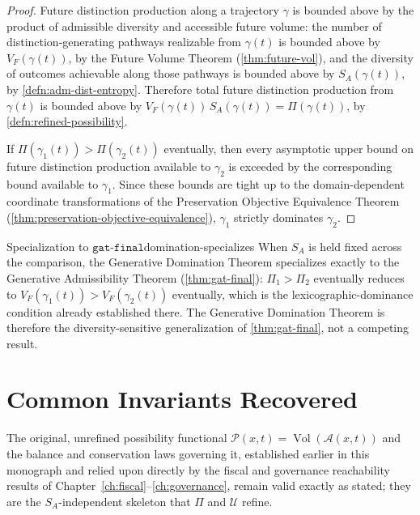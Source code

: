 \documentclass[12pt,twoside,openright]{book}
\newcommand{\adm}{\mathcal{A}}
\newcommand{\Vol}{\operatorname{Vol}}
\begin{document}
\begin{proof}
  Future distinction production along a trajectory $\gamma$
  is bounded above by the product of admissible diversity
  and accessible future volume: the number of
  distinction-generating pathways realizable from $\gamma(t)$
  is bounded above by $V_F(\gamma(t))$, by the Future Volume
  Theorem (\cref{thm:future-vol}), and the diversity of
  outcomes achievable along those pathways is bounded above
  by $S_A(\gamma(t))$, by \cref{defn:adm-dist-entropy}.
  Therefore total future distinction production from
  $\gamma(t)$ is bounded above by
  $V_F(\gamma(t))\,S_A(\gamma(t)) = \Pi(\gamma(t))$, by
  \cref{defn:refined-possibility}.

  If $\Pi(\gamma_1(t)) > \Pi(\gamma_2(t))$ eventually, then
  every asymptotic upper bound on future distinction
  production available to $\gamma_2$ is exceeded by the
  corresponding bound available to $\gamma_1$. Since these
  bounds are tight up to the domain-dependent coordinate
  transformations of the Preservation Objective Equivalence
  Theorem
  (\cref{thm:preservation-objective-equivalence}), $\gamma_1$ strictly
  dominates $\gamma_2$.
\end{proof}

\begin{remark}{Specialization to $\mathtt{gat\text{-}final}$}{domination-specializes}
  When $S_A$ is held fixed across the comparison, the
  Generative Domination Theorem specializes exactly to the
  Generative Admissibility Theorem
  (\cref{thm:gat-final}): $\Pi_1>\Pi_2$ eventually reduces to
  $V_F(\gamma_1(t)) > V_F(\gamma_2(t))$ eventually, which is
  the lexicographic-dominance condition already established
  there. The Generative Domination Theorem is therefore the
  diversity-sensitive generalization of
  \cref{thm:gat-final}, not a competing result.
\end{remark}

\section{Common Invariants Recovered}
\label{sec:ch31-common}

The original, unrefined possibility functional
$\mathcal{P}(x,t)=\Vol(\adm(x,t))$ and the balance and
conservation laws governing it, established earlier in this
monograph and relied upon directly by the fiscal and
governance reachability results of
Chapter~\ref{ch:fiscal}--\ref{ch:governance}, remain valid
exactly as stated; they are the $S_A$-independent skeleton
that $\Pi$ and $\mathcal{U}$ refine.
\end{document}
